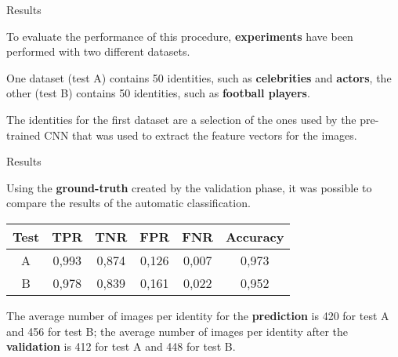 \begin{tframe}{Results}

To evaluate the performance of this procedure, \textbf{experiments} have been performed with two different datasets.

\vspace{0.1in}

One dataset (test A) contains 50 identities, such as \textbf{celebrities} and \textbf{actors}, the other (test B) contains 50 identities, such as \textbf{football players}. 

\vspace{0.1in}

The identities for the first dataset are a selection of the ones used by the pre-trained CNN that was used to extract the feature vectors for the images.

\end{tframe}


\begin{tframe}{Results}

Using the \textbf{ground-truth} created by the validation phase, it was possible to compare the results of the automatic classification.

\begin{table}[ht]
\centering %
\begin{tabular}{c c c c c c} %
\hline\hline %
Test & TPR & TNR & FPR & FNR & Accuracy \\ [0.5ex] %
\hline %
A & 0,993 & 0,874 & 0,126 & 0,007 & 0,973 \\
B & 0,978 & 0,839 & 0,161 & 0,022 & 0,952 \\ [1ex] %
\hline %
\end{tabular}
\label{table:nonlin} %
\end{table}

\vspace{0.1in}

The average number of images per identity for the \textbf{prediction} is 420 for test A and 456 for test B; the average number of images per identity after the \textbf{validation} is 412 for test A and 448 for test B.

\end{tframe}